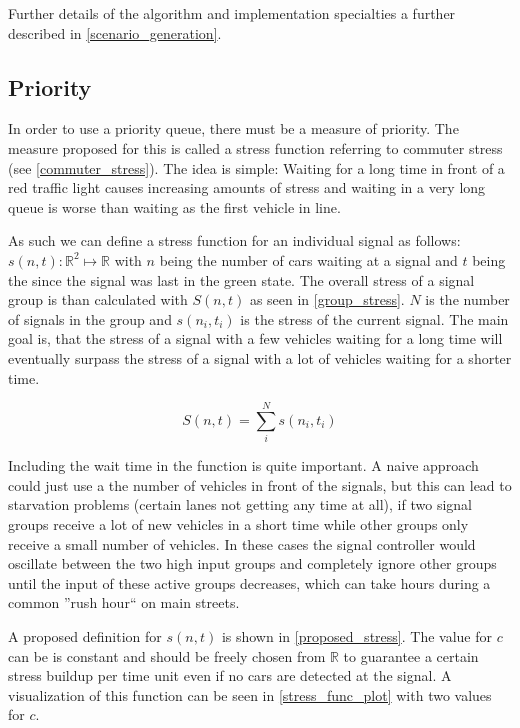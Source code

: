 Further details of the algorithm and implementation specialties a further described in \autoref{scenario_generation}.

\subsection*{Priority}

In order to use a priority queue, there must be a measure of priority. The measure proposed for this is called a stress function referring to commuter stress (see \autoref{commuter_stress}). The idea is simple: Waiting for a long time in front of a red traffic light causes increasing amounts of stress and waiting in a very long queue is worse than waiting as the first vehicle in line.

As such we can define a stress function for an individual signal as follows: $s(n, t): \mathbb{R}^2 \mapsto \mathbb{R}$ with $n$ being the number of cars waiting at a signal and $t$ being the since the signal was last in the green state. The overall stress of a signal group is than calculated with $S(n, t)$ as seen in \autoref{group_stress}. $N$ is the number of signals in the group and $s\left(n_i, t_i\right)$ is the stress of the current signal. The main goal is, that the stress of a signal with a few vehicles waiting for a long time will eventually surpass the stress of a signal with a lot of vehicles waiting for a shorter time. 

\begin{equation}
	\label{group_stress}
	S(n, t) = \sum_{i}^{N}{s\left(n_i, t_i\right)}
\end{equation}

Including the wait time in the function is quite important. A naive approach could just use a the number of vehicles in front of the signals, but this can lead to starvation problems (certain lanes not getting any time at all), if two signal groups receive a lot of new vehicles in a short time while other groups only receive a small number of vehicles. In these cases the signal controller would oscillate between the two high input groups and completely ignore other groups until the input of these active groups decreases, which can take hours during a common ''rush hour`` on main streets.

A proposed definition for $s(n, t) $ is shown in \autoref{proposed_stress}. The value for $c$ can be is constant and should be freely chosen from $\mathbb{R}$ to guarantee a certain stress buildup per time unit even if no cars are detected at the signal. A visualization of this function can be seen in \autoref{stress_func_plot} with two values for $c$.

